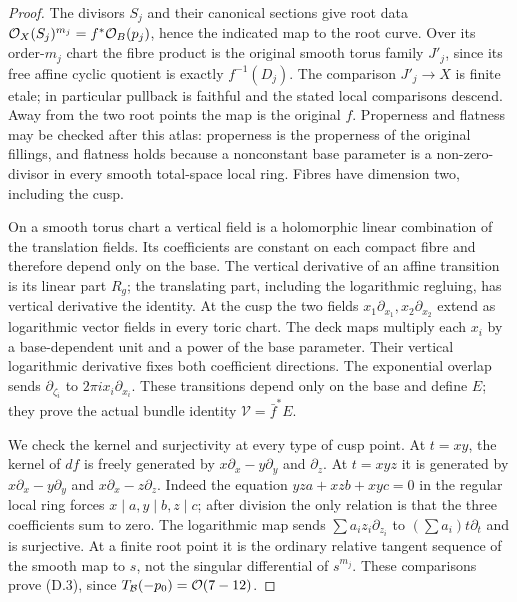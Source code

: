 \begin{proof}
The divisors $S_j$ and their canonical sections give root data
$\mathcal O_X(S_j)^{m_j}=f^*\mathcal O_B(p_j)$, hence the indicated map to the root
curve. Over its order-$m_j$ chart the fibre product is the original
smooth torus family $J'_j$, since its free affine cyclic quotient is
exactly $f^{-1}(D_j)$. The comparison $J'_j\to X$ is finite etale;
in particular pullback is faithful and the stated local comparisons
descend. Away from the two root points the map is the original $f$.
Properness and flatness may be checked after this atlas: properness is
the properness of the original fillings, and flatness holds because a
nonconstant base parameter is a non-zero-divisor in every smooth
total-space local ring. Fibres have dimension two, including the cusp.

On a smooth torus chart a vertical field is a holomorphic linear
combination of the translation fields. Its coefficients are constant
on each compact fibre and therefore depend only on the base. The
vertical derivative of an affine transition is its linear part $R_g$;
the translating part, including the logarithmic regluing, has vertical
derivative the identity. At the cusp the two fields
$x_1\partial_{x_1},x_2\partial_{x_2}$ extend as logarithmic vector
fields in every toric chart. The deck maps multiply each $x_i$ by a
base-dependent unit and a power of the base parameter. Their vertical
logarithmic derivative fixes both coefficient directions. The
exponential overlap sends $\partial_{\zeta_i}$ to
$2\pi i x_i\partial_{x_i}$. These transitions depend only on the base
and define $E$; they prove the actual bundle identity
$\mathcal V=\bar f^*E$.

We check the kernel and surjectivity at every type of cusp point. At
$t=xy$, the kernel of $df$ is freely generated by
$x\partial_x-y\partial_y$ and $\partial_z$. At $t=xyz$ it is generated
by $x\partial_x-y\partial_y$ and $x\partial_x-z\partial_z$.
Indeed the equation $yz a+xz b+xy c=0$ in the regular local ring forces
$x\mid a,y\mid b,z\mid c$; after division the only relation is that
the three coefficients sum to zero. The logarithmic map sends
$\sum a_i z_i\partial_{z_i}$ to $(\sum a_i)t\partial_t$ and is
surjective. At a finite root point it is the ordinary relative tangent
sequence of the smooth map to $s$, not the singular differential of
$s^{m_j}$. These comparisons prove (D.3), since
$T_{\mathcal B}(-p_0)=\mathcal O(7-12)$.


\end{proof}
